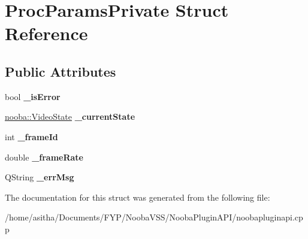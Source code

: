 \hypertarget{struct_proc_params_private}{\section{Proc\-Params\-Private Struct Reference}
\label{struct_proc_params_private}
}
\subsection*{Public Attributes}
\begin{DoxyCompactItemize}
\item 
\hypertarget{struct_proc_params_private_abf93f72a095a036e15cde96a06ad4543}{bool {\bfseries \-\_\-is\-Error}}\label{struct_proc_params_private_abf93f72a095a036e15cde96a06ad4543}

\item 
\hypertarget{struct_proc_params_private_a42b05bcd78f019df67b0d33f3b1b45d4}{\hyperlink{namespacenooba_ae2951593fff55d4ea388efa06a663468}{nooba\-::\-Video\-State} {\bfseries \-\_\-current\-State}}\label{struct_proc_params_private_a42b05bcd78f019df67b0d33f3b1b45d4}

\item 
\hypertarget{struct_proc_params_private_a7c40008e121da968d06f5db84552a078}{int {\bfseries \-\_\-frame\-Id}}\label{struct_proc_params_private_a7c40008e121da968d06f5db84552a078}

\item 
\hypertarget{struct_proc_params_private_af3a49c173c14ce1be21d7289379395ff}{double {\bfseries \-\_\-frame\-Rate}}\label{struct_proc_params_private_af3a49c173c14ce1be21d7289379395ff}

\item 
\hypertarget{struct_proc_params_private_afd4955dfad038918e2be4580b9441f2b}{Q\-String {\bfseries \-\_\-err\-Msg}}\label{struct_proc_params_private_afd4955dfad038918e2be4580b9441f2b}

\end{DoxyCompactItemize}


The documentation for this struct was generated from the following file\-:\begin{DoxyCompactItemize}
\item 
/home/asitha/\-Documents/\-F\-Y\-P/\-Nooba\-V\-S\-S/\-Nooba\-Plugin\-A\-P\-I/noobapluginapi.\-cpp\end{DoxyCompactItemize}
